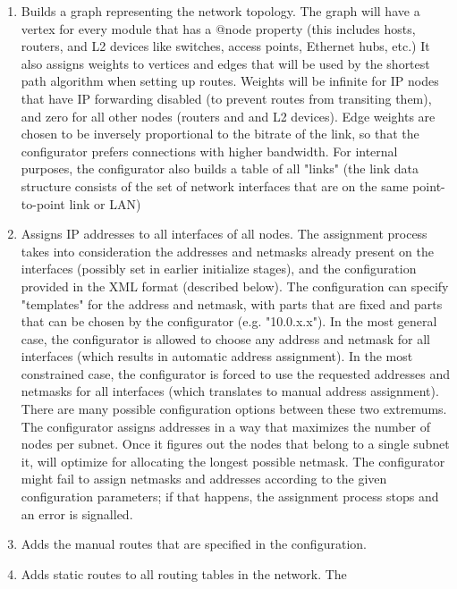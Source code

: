 \begin{enumerate}
  \item  Builds a graph representing the network topology. The graph
     will have a vertex for every module that has a @node property (this
     includes hosts, routers, and L2 devices like switches, access points,
     Ethernet hubs, etc.) It also assigns weights to vertices and edges that
     will be used by the shortest path algorithm when setting up routes.
     Weights will be infinite for IP nodes that have IP forwarding disabled
     (to prevent routes from transiting them), and zero for all other nodes
     (routers and and L2 devices). Edge weights are chosen to be inversely
     proportional to the bitrate of the link, so that the configurator
     prefers connections with higher bandwidth. For internal purposes,
     the configurator also builds a table of all "links" (the link data
     structure consists of the set of network interfaces that are
     on the same point-to-point link or LAN)
  \item  Assigns IP addresses to all interfaces of all nodes. The
     assignment process takes into consideration the addresses and netmasks
     already present on the interfaces (possibly set in earlier initialize
     stages), and the configuration provided in the XML format (described
     below). The configuration can specify "templates" for the address
     and netmask, with parts that are fixed and parts that can be chosen
     by the configurator (e.g. "10.0.x.x"). In the most general case,
     the configurator is allowed to choose any address and netmask for all
     interfaces (which results in automatic address assignment). In the most
     constrained case, the configurator is forced to use the requested addresses
     and netmasks for all interfaces (which translates to manual address assignment).
     There are many possible configuration options between these two extremums. The
     configurator assigns addresses in a way that maximizes the number of
     nodes per subnet. Once it figures out the nodes that belong to a single
     subnet it, will optimize for allocating the longest possible netmask.
     The configurator might fail to assign netmasks and addresses according
     to the given configuration parameters; if that happens, the assignment
     process stops and an error is signalled.
  \item  Adds the manual routes that are specified in the configuration.
  \item  Adds static routes to all routing tables in the network. The

\end{enumerate}
